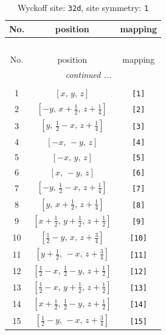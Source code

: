 \documentclass[fleqn,8pt]{jsarticle}
\begin{document}
\renewcommand{\arraystretch}{1.2}
\begin{longtable}{ccc}
\caption{Wyckoff site: {\tt 32d}, site symmetry: {\tt 1}}
 \\
 \hline \hline
No. & position & mapping \\ \hline \endfirsthead

\multicolumn{2}{l}{\tablename\ \thetable{}} \\
 \hline \hline
No. & position & mapping \\ \hline \endhead

 \hline \hline
\multicolumn{2}{r}{\footnotesize\it continued ...} \\ \endfoot

 \hline \hline
\multicolumn{2}{r}{} \\ \endlastfoot

1 & $\left[ x,\, y,\, z \right]$ & {\tt [1]} \\ \hline
2 & $\left[ - y,\, x + \frac{1}{2},\, z + \frac{1}{4} \right]$ & {\tt [2]} \\ \hline
3 & $\left[ y,\, \frac{1}{2} - x,\, z + \frac{1}{4} \right]$ & {\tt [3]} \\ \hline
4 & $\left[ - x,\, - y,\, z \right]$ & {\tt [4]} \\ \hline
5 & $\left[ - x,\, y,\, z \right]$ & {\tt [5]} \\ \hline
6 & $\left[ x,\, - y,\, z \right]$ & {\tt [6]} \\ \hline
7 & $\left[ - y,\, \frac{1}{2} - x,\, z + \frac{1}{4} \right]$ & {\tt [7]} \\ \hline
8 & $\left[ y,\, x + \frac{1}{2},\, z + \frac{1}{4} \right]$ & {\tt [8]} \\ \hline
9 & $\left[ x + \frac{1}{2},\, y + \frac{1}{2},\, z + \frac{1}{2} \right]$ & {\tt [9]} \\ \hline
10 & $\left[ \frac{1}{2} - y,\, x,\, z + \frac{3}{4} \right]$ & {\tt [10]} \\ \hline
11 & $\left[ y + \frac{1}{2},\, - x,\, z + \frac{3}{4} \right]$ & {\tt [11]} \\ \hline
12 & $\left[ \frac{1}{2} - x,\, \frac{1}{2} - y,\, z + \frac{1}{2} \right]$ & {\tt [12]} \\ \hline
13 & $\left[ \frac{1}{2} - x,\, y + \frac{1}{2},\, z + \frac{1}{2} \right]$ & {\tt [13]} \\ \hline
14 & $\left[ x + \frac{1}{2},\, \frac{1}{2} - y,\, z + \frac{1}{2} \right]$ & {\tt [14]} \\ \hline
15 & $\left[ \frac{1}{2} - y,\, - x,\, z + \frac{3}{4} \right]$ & {\tt [15]} \\ \hline

\end{longtable}
\end{document}
